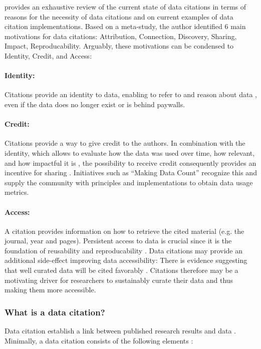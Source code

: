 \documentclass[a4paper,10pt]{article}
\begin{document}
\cite{Silvello2017} provides an exhaustive review of the current state of data citations in terms of reasons for the necessity of data citations and on current examples of data citation implementations. Based on a meta-study, the author identified 6 main motivations for data citations: Attribution, Connection, Discovery, Sharing, Impact, Reproducability. 
Arguably, these motivations can be condensed to Identity, Credit, and Access: 

\paragraph{Identity:} 
Citations provide an identity to data, enabling to refer to and reason about data \citep{Bandrowski2016}, even if the data does no longer exist or is behind paywalls. 
\paragraph{Credit:}
Citations provide a way to give credit to the authors. 
In combination with the identity, which allows to evaluate how the data was used over time, how relevant, and how impactful it is \citep{Honor2016}, the possibility to receive credit consequently provides an incentive for sharing \citep{Niemeyer2016, Callaghan2012, Kratz2014}. Initiatives such as ``Making Data Count''\citep{Kratz2015} recognize this and supply the community with principles and implementations to obtain data usage metrics.

\paragraph{Access:} 
A citation provides information on how to retrieve the cited material (e.g. the journal, year and pages). Persistent access to data is crucial since it is the foundation of reusability and reproducability \citep{Starr2015}.
Data citations may provide an additional side-effect improving data accessibility: There is evidence suggesting that well curated data will be cited favorably \citep{Belter2014}. Citations therefore may be a motivating driver for researchers to sustainably curate their data and thus making them more accessible.


\subsubsection{What is a data citation?}
Data citation establish a link between published research results and data \citep{CODATA2013}. Minimally, a data citation consists of the following elements \citep{Cook2016}:
\end{document}
